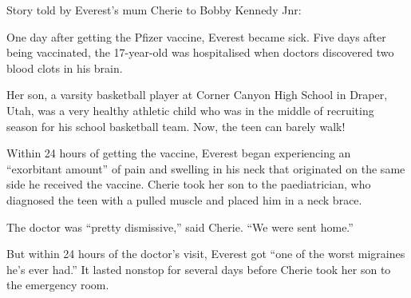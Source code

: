 Story told by Everest’s mum Cherie to Bobby Kennedy Jnr:

One day after getting the Pfizer vaccine, Everest became sick. Five days after
being vaccinated, the 17-year-old was hospitalised when doctors discovered two
blood clots in his brain.

Her son, a varsity basketball player at Corner Canyon High School in Draper,
Utah, was a very healthy athletic child who was in the middle of recruiting
season for his school basketball team. Now, the teen can barely walk!

Within 24 hours of getting the vaccine, Everest began experiencing an
“exorbitant amount” of pain and swelling in his neck that originated on the same
side he received the vaccine. Cherie took her son to the paediatrician, who
diagnosed the teen with a pulled muscle and placed him in a neck brace.

The doctor was “pretty dismissive,” said Cherie. “We were sent home.”

But within 24 hours of the doctor’s visit, Everest got “one of the worst
migraines he’s ever had.” It lasted nonstop for several days before Cherie took
her son to the emergency room.


